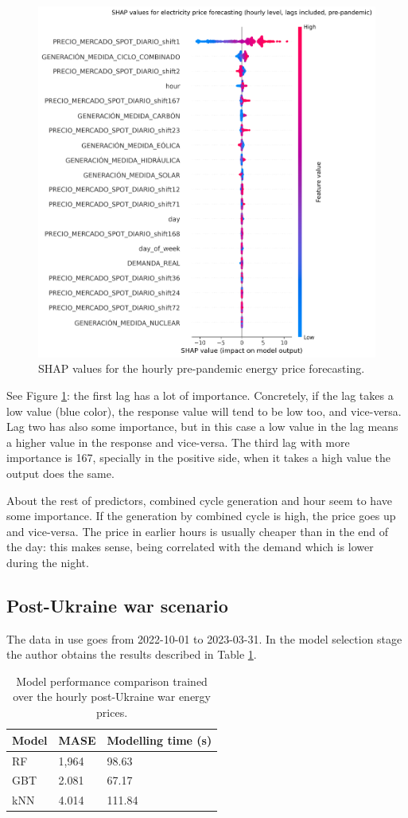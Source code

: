 \begin{figure}[H]
\centering
    \includegraphics[width=0.7\linewidth]{images/analysis/shap-hourly-pre}
    \caption{SHAP values for the hourly pre-pandemic energy price forecasting.}
    \label{fig:shap-hourly-pre}
\end{figure}

See Figure \ref{fig:shap-hourly-pre}: the first lag has a lot of importance. Concretely, if the lag takes a low value (blue color), the response value will tend to be low too, and vice-versa. Lag two has also some importance, but in this case a low value in the lag means a higher value in the response and vice-versa. The third lag with more importance is 167, specially in the positive side, when it takes a high value the output does the same.

About the rest of predictors, combined cycle generation and hour seem to have some importance. If the generation by combined cycle is high, the price goes up and vice-versa. The price in earlier hours is usually cheaper than in the end of the day: this makes sense, being correlated with the demand which is lower during the night.


\subsection{Post-Ukraine war scenario}
The data in use goes from 2022-10-01 to 2023-03-31. In the model selection stage the author obtains the results described in Table \ref{tab:cv-hourly-post}.

\begin{table}[H]
\centering
\begin{tabular}{@{}l|l|l@{}}
\toprule
Model & MASE  & Modelling time (s)  \\ \midrule
RF    & 1,964 & 98.63               \\
GBT   & 2.081 & 67.17               \\
kNN   & 4.014 & 111.84              \\ \bottomrule
\end{tabular}
\caption{Model performance comparison trained over the hourly post-Ukraine war energy prices.}
\label{tab:cv-hourly-post}
\end{table}

